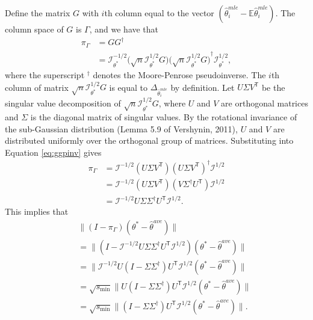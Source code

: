 \documentclass[twoside]{article}
\newcommand{\smin}{s_\text{min}}
\newcommand{\matW}{\hat W}
\newcommand{\matV}{\hat V}
\newcommand{\W}{{\hat \Theta^{\textit{owa}}}}
\newcommand{\E}{\mathbb{E}}
\newcommand{\w}{\theta}
\newcommand{\wave}{\hat\w^{ave}}
\newcommand{\wmle}{\hat\w^{mle}}
\newcommand{\wstar}{{\w^{*}}}
\newcommand{\I}{\mathcal I}
\newcommand{\trans}[1]{\ensuremath{{#1}^{\mathsf{T}}}}
\newcommand{\pinv}[1]{\ensuremath{{#1}^{\mathsf{\dagger}}}}
\newcommand{\ltwo}[1]{{\lVert {#1} \rVert}}
\newcommand{\proj}[1]{\pi_{{#1}}}
\begin{document}
Define the matrix $G$ with $i$th column equal to the vector $(\wmle_i-\E\wmle_i)$.
The column space of $G$ is $\Gamma$,
and we have that
\begin{align}
\proj\Gamma
&=
G\pinv G
\\
&= \I_\wstar^{-1/2}\bigg(\sqrt{n}\I_\wstar^{1/2}G\bigg)
             \pinv{\bigg(\sqrt{n}\I_\wstar^{1/2}G\bigg)}
   \I_\wstar^{1/2}
,
\label{eq:ggpinv}
\end{align}
where the superscript $\pinv{}$ denotes the Moore-Penrose pseudoinverse.
The $i$th column of matrix $\sqrt{n}\I^{1/2}_{\wstar}G$ is equal to $\Delta_{\wmle_i}$ by definition.
%
Let $U\Sigma \trans V$ be the singular value decomposition of $\sqrt{n}\I^{1/2}_{\wstar}G$,
where $U$ and $V$ are orthogonal matrices and $\Sigma$ is the diagonal matrix of singular values.
By the rotational invariance of the sub-Gaussian distribution (Lemma 5.9 of Vershynin, 2011),
$U$ and $V$ are distributed uniformly over the orthogonal group of matrices.
Substituting into Equation \ref{eq:ggpinv} gives
\begin{align}
\proj\Gamma
&= \I^{-1/2} (U\Sigma \trans V)\pinv{(U \Sigma \trans V)} \I^{1/2}
\\
&= \I^{-1/2} (U\Sigma \trans V)(V \pinv\Sigma \trans U) \I^{1/2}
\\
&= \I^{-1/2} U\Sigma \pinv\Sigma \trans U \I^{1/2}
.
\label{eq:vvp2}
\end{align}
This implies that
\begin{align}
~~~~~&\!\!\!\!\!\!\!\!\!\!\!\ltwo{(I-\proj\Gamma)(\wstar-\wave)}
\nonumber
\\
&=
\ltwo{(I-\I^{-1/2} U\Sigma \pinv\Sigma \trans U \I^{1/2})(\wstar - \wave)}
\\
&=
\ltwo{\I^{-1/2} U(I-\Sigma \pinv\Sigma )\trans U \I^{1/2}(\wstar - \wave)}
\\
&=
\sqrt{\smin}\ltwo{U(I-\Sigma \pinv\Sigma )\trans U \I^{1/2}(\wstar - \wave)}
\label{eq:fromdefsmin}
\\
&=
\sqrt{\smin}\ltwo{(I-\Sigma \pinv\Sigma )\trans U \I^{1/2}(\wstar - \wave)}
\label{eq:fromrotinvl2}
.
\end{align}
\end{document}
